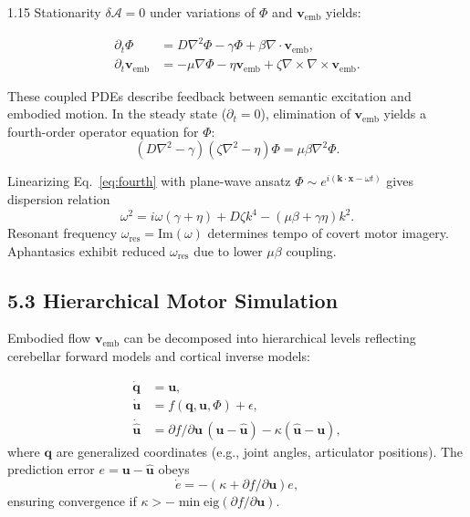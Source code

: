 \documentclass[12pt,a4paper]{article}
\begin{document}
\begin{spacing}{1.15}
Stationarity $\delta\mathcal{A}=0$ under variations of $\Phi$ and $\boldsymbol{v}_{\mathrm{emb}}$ yields:

\begin{align}
\partial_t\Phi &= D\nabla^2\Phi - \gamma\Phi + \beta\nabla\!\cdot\boldsymbol{v}_{\mathrm{emb}},\\[3pt]
\partial_t\boldsymbol{v}_{\mathrm{emb}} &= -\mu\nabla\Phi - \eta\boldsymbol{v}_{\mathrm{emb}} + \zeta\nabla\times\nabla\times\boldsymbol{v}_{\mathrm{emb}}.
\end{align}

These coupled PDEs describe feedback between semantic excitation and embodied motion.  
In the steady state ($\partial_t=0$), elimination of $\boldsymbol{v}_{\mathrm{emb}}$ yields a fourth-order operator equation for $\Phi$:
\begin{equation}
(D\nabla^2-\gamma)(\zeta\nabla^2-\eta)\Phi = \mu\beta\nabla^2\Phi.
\label{eq:fourth}
\end{equation}

\begin{corollary}
Linearizing Eq.~\eqref{eq:fourth} with plane-wave ansatz $\Phi\!\sim\!e^{i(\mathbf{k}\cdot\mathbf{x}-\omega t)}$ gives dispersion relation
\[
\omega^2 = i\omega(\gamma+\eta) + D\zeta k^4 - (\mu\beta+\gamma\eta)k^2.
\]
Resonant frequency $\omega_{\mathrm{res}}\!=\!\mathrm{Im}(\omega)$ determines tempo of covert motor imagery.  Aphantasics exhibit reduced $\omega_{\mathrm{res}}$ due to lower $\mu\beta$ coupling.
\end{corollary}

\subsection{5.3 Hierarchical Motor Simulation}

Embodied flow $\boldsymbol{v}_{\mathrm{emb}}$ can be decomposed into hierarchical levels reflecting cerebellar forward models and cortical inverse models:

\begin{align}
\dot{\mathbf{q}} &= \mathbf{u},\\
\dot{\mathbf{u}} &= f(\mathbf{q},\mathbf{u},\Phi) + \epsilon,\\
\dot{\widehat{\mathbf{u}}} &= \partial f/\partial\mathbf{u}\,(\mathbf{u}-\widehat{\mathbf{u}}) - \kappa(\widehat{\mathbf{u}}-\mathbf{u}),
\end{align}
where $\mathbf{q}$ are generalized coordinates (e.g., joint angles, articulator positions).  
The prediction error $e=\mathbf{u}-\widehat{\mathbf{u}}$ obeys
\[
\dot e = -(\kappa+\partial f/\partial\mathbf{u})e,
\]
ensuring convergence if $\kappa>-\min\mathrm{eig}(\partial f/\partial\mathbf{u})$.


\end{spacing}
\end{document}
